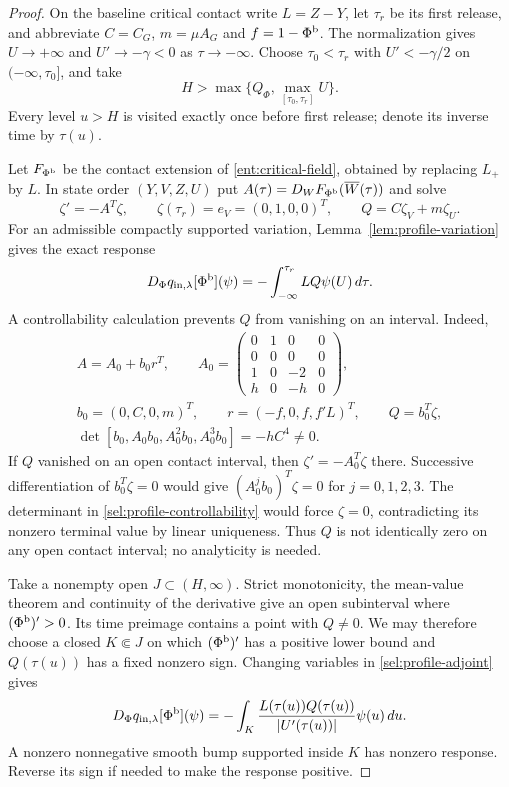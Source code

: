 \begin{proof}
On the baseline critical contact write $L=Z-Y$, let $\tau_r$
be its first release, and abbreviate $C=C_G$, $m=\mu A_G$ and
$f=1-\Phi^{\rm b}$. The normalization gives $U\to+\infty$ and
$U'\to-\gamma<0$ as $\tau\to-\infty$. Choose $\tau_0<\tau_r$
with $U'<-\gamma/2$ on $(-\infty,\tau_0]$, and take
\[
 H>\max\{Q_\Phi,\max_{[\tau_0,\tau_r]}U\}.
\]
Every level $u>H$ is visited exactly once before first release;
denote its inverse time by $\tau(u)$.

Let $F_{\Phi^{\rm b}}$ be the contact extension of
\eqref{ent:critical-field}, obtained by replacing $L_+$ by $L$.
In state order $(Y,V,Z,U)$ put
$A(\tau)=D_WF_{\Phi^{\rm b}}(\overline W(\tau))$ and solve
\[
 \zeta'=-A^T\zeta,\qquad
 \zeta(\tau_r)=e_V=(0,1,0,0)^T,\qquad Q=C\zeta_V+m\zeta_U.
\]
For an admissible compactly supported variation,
Lemma~\ref{lem:profile-variation} gives the exact response
\begin{equation}
 D_\Phi q_{\rm in,\lambda}[\Phi^{\rm b}](\psi)
   =-\int_{-\infty}^{\tau_r}LQ\psi(U)\,d\tau.
 \label{sel:profile-adjoint}
\end{equation}
A controllability calculation prevents $Q$ from vanishing on an
interval. Indeed,
\begin{equation}
 \begin{gathered}
 A=A_0+b_0r^T,\qquad
 A_0=\begin{pmatrix}
 0&1&0&0\\0&0&0&0\\1&0&-2&0\\h&0&-h&0
 \end{pmatrix},\\
 b_0=(0,C,0,m)^T,\qquad r=(-f,0,f,f'L)^T,\qquad Q=b_0^T\zeta,
 \\
 \det[b_0,A_0b_0,A_0^2b_0,A_0^3b_0]=-hC^4\ne0.
 \end{gathered}
 \label{sel:profile-controllability}
\end{equation}
If $Q$ vanished on an open contact interval, then
$\zeta'=-A_0^T\zeta$ there. Successive differentiation of
$b_0^T\zeta=0$ would give
$(A_0^jb_0)^T\zeta=0$ for $j=0,1,2,3$.
The determinant in \eqref{sel:profile-controllability} would force
$\zeta=0$, contradicting its nonzero terminal value by linear
uniqueness. Thus $Q$ is not identically zero on any open contact
interval; no analyticity is needed.

Take a nonempty open $J\subset(H,\infty)$. Strict monotonicity,
the mean-value theorem and continuity of the derivative give an open
subinterval where $(\Phi^{\rm b})'>0$. Its time preimage contains
a point with $Q\ne0$. We may therefore choose a closed $K\Subset J$
on which $(\Phi^{\rm b})'$ has a positive lower bound and
$Q(\tau(u))$ has a fixed nonzero sign. Changing variables in
\eqref{sel:profile-adjoint} gives
\[
 D_\Phi q_{\rm in,\lambda}[\Phi^{\rm b}](\psi)
   =-\int_K\frac{L(\tau(u))Q(\tau(u))}{|U'(\tau(u))|}
                   \psi(u)\,du.
\]
A nonzero nonnegative smooth bump supported inside $K$ has nonzero
response. Reverse its sign if needed to make the response positive.


\end{proof}
